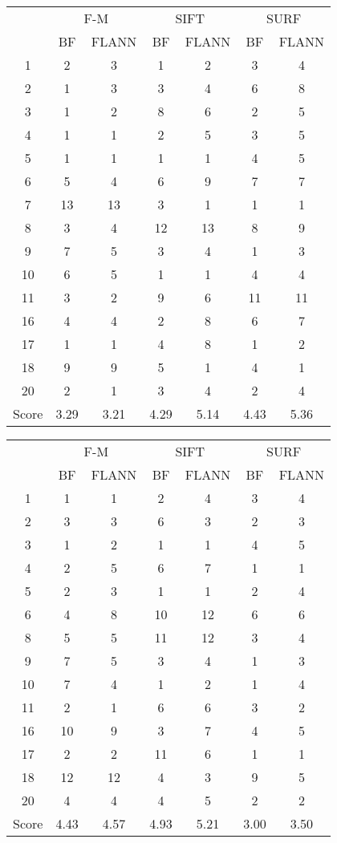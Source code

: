 \documentclass[draft,final]{vutinfth} %
\begin{document}
\begin{appendices}
\begin{minipage}{\linewidth}
\centering
\begin{tabular}{c|cc|cc|cc}
\multirow{2}{*}{ } & \multicolumn{2}{c}{ F-M } & \multicolumn{2}{c}{ SIFT } & \multicolumn{2}{c}{ SURF } \\
& BF & FLANN & BF & FLANN & BF & FLANN \\
\hline
1 & 2 & 3 & 1 & 2 & 3 & 4 \\
2 & 1 & 3 & 3 & 4 & 6 & 8 \\
3 & 1 & 2 & 8 & 6 & 2 & 5 \\
4 & 1 & 1 & 2 & 5 & 3 & 5 \\
5 & 1 & 1 & 1 & 1 & 4 & 5 \\
6 & 5 & 4 & 6 & 9 & 7 & 7 \\
7 & 13 & 13 & 3 & 1 & 1 & 1 \\
8 & 3 & 4 & 12 & 13 & 8 & 9 \\
9 & 7 & 5 & 3 & 4 & 1 & 3 \\
10 & 6 & 5 & 1 & 1 & 4 & 4 \\
11 & 3 & 2 & 9 & 6 & 11 & 11 \\
16 & 4 & 4 & 2 & 8 & 6 & 7 \\
17 & 1 & 1 & 4 & 8 & 1 & 2 \\
18 & 9 & 9 & 5 & 1 & 4 & 1 \\
20 & 2 & 1 & 3 & 4 & 2 & 4 \\
\hline
Score & 3.29 & 3.21 & 4.29 & 5.14 & 4.43 & 5.36 \\
\end{tabular}
 \label{tab:25Cent} 
\end{minipage}

\begin{minipage}{\linewidth}
\centering
\begin{tabular}{c|cc|cc|cc}
\multirow{2}{*}{ } & \multicolumn{2}{c}{ F-M } & \multicolumn{2}{c}{ SIFT } & \multicolumn{2}{c}{ SURF } \\
& BF & FLANN & BF & FLANN & BF & FLANN \\
\hline
1 & 1 & 1 & 2 & 4 & 3 & 4 \\
2 & 3 & 3 & 6 & 3 & 2 & 3 \\
3 & 1 & 2 & 1 & 1 & 4 & 5 \\
4 & 2 & 5 & 6 & 7 & 1 & 1 \\
5 & 2 & 3 & 1 & 1 & 2 & 4 \\
6 & 4 & 8 & 10 & 12 & 6 & 6 \\
8 & 5 & 5 & 11 & 12 & 3 & 4 \\
9 & 7 & 5 & 3 & 4 & 1 & 3 \\
10 & 7 & 4 & 1 & 2 & 1 & 4 \\
11 & 2 & 1 & 6 & 6 & 3 & 2 \\
16 & 10 & 9 & 3 & 7 & 4 & 5 \\
17 & 2 & 2 & 11 & 6 & 1 & 1 \\
18 & 12 & 12 & 4 & 3 & 9 & 5 \\
20 & 4 & 4 & 4 & 5 & 2 & 2 \\
\hline
Score & 4.43 & 4.57 & 4.93 & 5.21 & 3.00 & 3.50 \\
\end{tabular}


\end{minipage}
\end{appendices}
\end{document}
